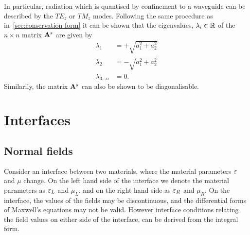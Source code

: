 In particular, radiation which is quantised by confinement to a waveguide can be
described by the $TE_z$ or $TM_z$ modes. Following the same procedure as 
in~\autoref{sec:conservation-form} it can be shown that the eigenvalues,
$\lambda_{i} \in \mathbb{R}$ of the $n \times n$ matrix $\mathbf{A}^{s}$ are given by
\begin{align}
  \lambda_{1} &= + \sqrt{a_1^2 + a_2^2} \\
  \lambda_{2} &= - \sqrt{a_1^2 + a_2^2} \\
  \lambda_{3...n} &= 0 .
\end{align}
Similarily, the matrix $\mathbf{A}^{s}$ can also be shown to be diagonalisable.

\section{Interfaces}
% 
%


\subsection{Normal fields}
Consider an interface between two materials, where the material parameters
$\varepsilon$ and $\mu$ change. On the left hand side of the interface we denote the
material parameters as $\varepsilon_L$ and $\mu_L$, and on the right hand side as
$\varepsilon_R$ and $\mu_R$. On the interface, the values of the fields may be
discontinuous, and the differential forms of Maxwell's equations may not be
valid. However interface conditions relating the field values on either side of
the interface, can be derived from the integral form.

